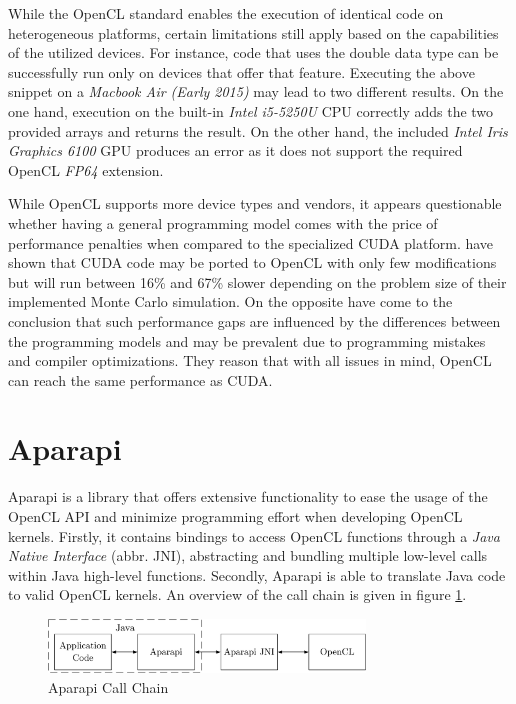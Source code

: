 While the OpenCL standard enables the execution of identical code on heterogeneous platforms, certain limitations still apply based on the capabilities of the utilized devices. For instance, code that uses the double data type can be successfully run only on devices that offer that feature. Executing the above snippet on a \textit{Macbook Air (Early 2015)} may lead to two different results. On the one hand, execution on the built-in \textit{Intel i5-5250U} CPU correctly adds the two provided arrays and returns the result. On the other hand, the included \textit{Intel Iris Graphics 6100} GPU produces an error as it does not support the required OpenCL \textit{FP64} extension.

While OpenCL supports more device types and vendors, it appears questionable whether having a general programming model comes with the price of performance penalties when compared to the specialized CUDA platform. \citeauthor{performance_comparison} have shown that CUDA code may be ported to OpenCL with only few modifications but will run between 16\% and 67\% slower depending on the problem size of their implemented Monte Carlo simulation\cite{performance_comparison}. On the opposite \citeauthor{comprehensive_performance_comparison} have come to the conclusion that such performance gaps are influenced by the differences between the programming models and may be prevalent due to programming mistakes and compiler optimizations\cite{comprehensive_performance_comparison}. They reason that with all issues in mind, OpenCL can reach the same performance as CUDA.

\section{Aparapi}
\label{aparapi}
Aparapi is a library that offers extensive functionality to ease the usage of the OpenCL API and minimize programming effort when developing OpenCL kernels\cite{aparapi}. Firstly, it contains bindings to access OpenCL functions through a \textit{Java Native Interface} (abbr. JNI), abstracting and bundling multiple low-level calls within Java high-level functions. Secondly, Aparapi is able to translate Java code to valid OpenCL kernels. An overview of the call chain is given in figure \ref{img:aparapi_call_chain}.

\begin{figure}[!htb]
	\includegraphics[width=0.75\textwidth]{drawings/aparapi_call_chain.pdf}
	\centering
	\caption{Aparapi Call Chain}
	\label{img:aparapi_call_chain}
\end{figure}

